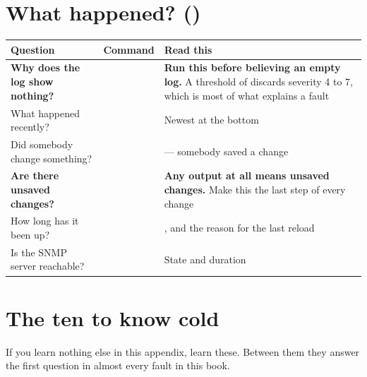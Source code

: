 \section{What happened? \textnormal{()}}

\begin{longtable}{@{}L{4.4cm}L{5.6cm}L{5.3cm}@{}}
\toprule
{}
\textbf{Question} & \textbf{Command} & \textbf{Read this} \\
\midrule
\endhead
\textbf{Why does the log show nothing?} &
 &
\textbf{Run this before believing an empty log.} A threshold of 
discards severity 4 to 7, which is most of what explains a fault \\
What happened recently? &
 &
Newest at the bottom \\
Did somebody change something? &
 &
 --- somebody saved a change \\
\textbf{Are there unsaved changes?} &
 \newline
{} \newline
{} &
\textbf{Any output at all means unsaved changes.} Make this the last step of
every change \\
How long has it been up? &
 &
, and the reason for the last reload \\
Is the SNMP server reachable? &
 \newline {} &
State and duration \\
\bottomrule
\end{longtable}

\section{The ten to know cold}

If you learn nothing else in this appendix, learn these. Between them they
answer the first question in almost every fault in this book.


